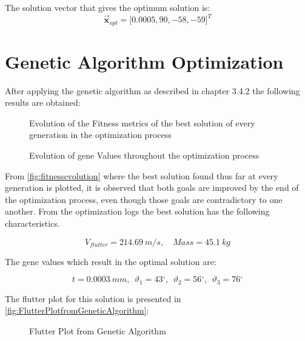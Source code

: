 The solution vector that gives the optimum solution is:\\
\begin{equation}
{\vec{\mathbf{x}}}_{opt} = \lbrack 0.0005,90, - 58, - 59\rbrack^{T}
\end{equation}


\section{Genetic Algorithm Optimization}
\label{genetic-algorithm-optimization}

After applying the genetic algorithm as described in chapter 3.4.2 the
following results are obtained:
\begin{figure}[H]
    \centering
    
    \caption{Evolution of the Fitness metrics of the best solution of every generation in the optimization process}
    \label{fig:fitnessevolution}
\end{figure}


\begin{figure}[H]
    \centering
    
    \caption{Evolution of gene Values throughout the optimization process}
\end{figure}



From \autoref{fig:fitnessevolution} where the best solution found thus far at every generation is plotted, it is observed that both goals are improved by the end of the optimization process, even though those goals are contradictory to one another. From the optimization logs the best solution has the following characteristics.

\begin{equation}
V_{flutter} = 214.69\ m/s,\quad Mass = 45.1\ kg
\end{equation}

The gene values which result in the optimal solution are:

\begin{equation}
t = 0.0003\ mm,\ \ \vartheta_{1} = 43{^\circ},\ \ \vartheta_{2} = 56{^\circ},\ \ \vartheta_{3} = 76{^\circ}
\end{equation}

The flutter plot for this solution is presented in \autoref{fig:FlutterPlotfromGeneticAlgorithm}:
\begin{figure}[H]
    \centering
    
    \caption{Flutter Plot from Genetic Algorithm}
    \label{fig:FlutterPlotfromGeneticAlgorithm}
\end{figure}

